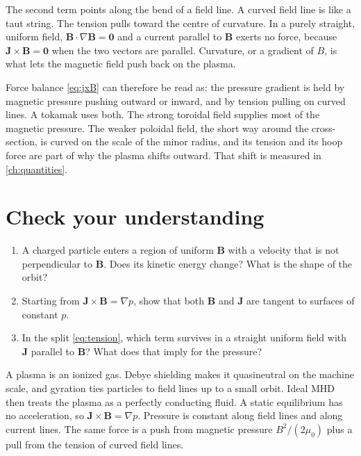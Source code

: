 \documentclass[11pt,a4paper,oneside,openany]{book}
\numberwithin{equation}{chapter}
\newcommand{\grad}{\nabla}
\theoremstyle{definition}
\begin{document}
The second term points along the bend of a field line. A curved field line is like a taut string. The tension pulls toward the centre of curvature. In a purely straight, uniform field, \(\mathbf{B}\cdot\grad\mathbf{B}=\mathbf{0}\) and a current parallel to \(\mathbf{B}\) exerts no force, because \(\mathbf{J}\times\mathbf{B}=\mathbf{0}\) when the two vectors are parallel. Curvature, or a gradient of \(B\), is what lets the magnetic field push back on the plasma.

Force balance \eqref{eq:jxB} can therefore be read as: the pressure gradient is held by magnetic pressure pushing outward or inward, and by tension pulling on curved lines. A tokamak uses both. The strong toroidal field supplies most of the magnetic pressure. The weaker poloidal field, the short way around the cross-section, is curved on the scale of the minor radius, and its tension and its hoop force are part of why the plasma shifts outward. That shift is measured in \cref{ch:quantities}.

\section*{Check your understanding}
\begin{enumerate}[label=\textbf{Q2.\arabic*.},leftmargin=2.4em]
\item A charged particle enters a region of uniform \(\mathbf{B}\) with a velocity that is not perpendicular to \(\mathbf{B}\). Does its kinetic energy change? What is the shape of the orbit?
\item Starting from \(\mathbf{J}\times\mathbf{B}=\grad p\), show that both \(\mathbf{B}\) and \(\mathbf{J}\) are tangent to surfaces of constant \(p\).
\item In the split \eqref{eq:tension}, which term survives in a straight uniform field with \(\mathbf{J}\) parallel to \(\mathbf{B}\)? What does that imply for the pressure?
\end{enumerate}

\begin{keyideas}
A plasma is an ionized gas. Debye shielding makes it quasineutral on the machine scale, and gyration ties particles to field lines up to a small orbit. Ideal MHD then treats the plasma as a perfectly conducting fluid. A static equilibrium has no acceleration, so \(\mathbf{J}\times\mathbf{B}=\grad p\). Pressure is constant along field lines and along current lines. The same force is a push from magnetic pressure \(B^{2}/(2\mu_{0})\) plus a pull from the tension of curved field lines.
\end{keyideas}
\end{document}
